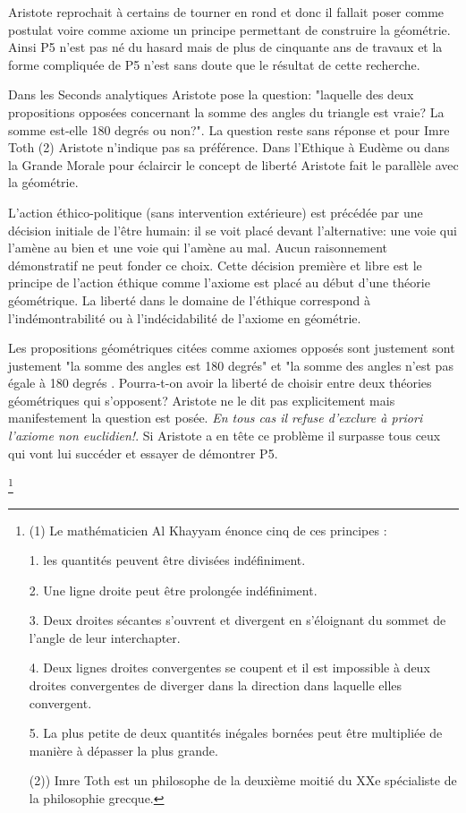\documentclass[a4paper, 12pt, twoside]{book}
\begin{document}
    
     Aristote reprochait à certains de tourner en rond et donc il fallait poser comme postulat  voire comme axiome un principe permettant de construire la géométrie. Ainsi P5 n'est pas né du hasard mais de plus de cinquante ans de travaux et la forme compliquée de P5 n'est sans doute que le résultat de cette recherche.

  Dans les Seconds analytiques Aristote pose la question: "laquelle des deux propositions opposées concernant la somme des angles du triangle est vraie? La somme est-elle 180 degrés ou non?". La question reste sans réponse et pour Imre Toth (2) Aristote n'indique pas sa préférence.
    Dans l'Ethique à Eudème ou dans la Grande Morale pour éclaircir le concept de liberté Aristote fait le parallèle avec la géométrie.\bigskip 
     
   L'action éthico-politique (sans intervention extérieure) est précédée par une décision initiale de l'être humain: il se voit placé devant l'alternative: une voie qui l'amène au bien et une voie qui l'amène au mal. Aucun raisonnement démonstratif  ne peut fonder ce choix. Cette décision première et libre est le principe de l'action éthique comme l'axiome  est placé au début d'une théorie géométrique. La liberté dans le domaine de l'éthique correspond à l'indémontrabilité ou à l'indécidabilité de l'axiome en géométrie.\bigskip 
   
   Les propositions géométriques citées comme axiomes opposés sont justement sont justement "la somme des angles est 180 degrés" et  "la somme des angles n'est pas égale à 180 degrés . Pourra-t-on avoir la liberté de choisir entre deux théories géométriques qui s'opposent? Aristote ne le dit pas explicitement mais manifestement la question est posée.   \emph{En tous cas il refuse d'exclure à priori l'axiome non euclidien!}. Si Aristote a en tête ce problème il surpasse tous ceux qui vont lui succéder et essayer de démontrer P5.\bigskip 
   
\footnote{(1)  Le mathématicien Al Khayyam énonce cinq de ces principes :
 
1. les quantités peuvent être divisées indéfiniment. 

2. Une ligne droite peut être prolongée indéfiniment.

3. Deux droites sécantes s'ouvrent et divergent en s'éloignant du sommet de l'angle de leur interchapter. 

4. Deux lignes droites convergentes se coupent et il est impossible à deux droites convergentes de diverger dans la direction dans laquelle elles convergent.


5. La plus petite de deux quantités inégales  bornées peut être multipliée de manière à dépasser la plus grande.\bigskip 



 
(2)) Imre Toth est un philosophe de la deuxième moitié du XXe spécialiste de la philosophie grecque.

} 
\end{document}
